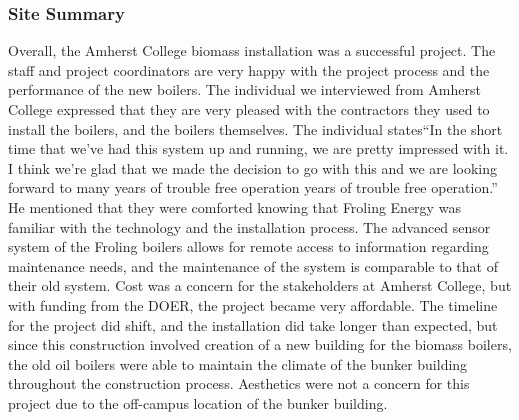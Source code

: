 \subsubsection{Site Summary}
\par Overall, the Amherst College biomass installation was a successful project. The staff and project coordinators are very happy with the project process and the performance of the new boilers. The individual we interviewed from Amherst College expressed that they are very pleased with the contractors they used to install the boilers, and the boilers themselves. The individual states“In the short time that we’ve had this system up and running, we are pretty impressed with it. I think we’re glad that we made the decision to go with this and we are looking forward to many years of trouble free operation years of trouble free operation.” He mentioned that they were comforted knowing that Froling Energy was familiar with the technology and the installation process. The advanced sensor system of the Froling boilers allows for remote access to information regarding maintenance needs, and the maintenance of the system is comparable to that of their old system. Cost was a concern for the stakeholders at Amherst College, but with funding from the DOER, the project became very affordable. The timeline for the project did shift, and the installation did take longer than expected, but since this construction involved creation of a new building for the biomass boilers, the old oil boilers were able to maintain the climate of the bunker building throughout the construction process. Aesthetics were not a concern for this project due to the off-campus location of the bunker building.

